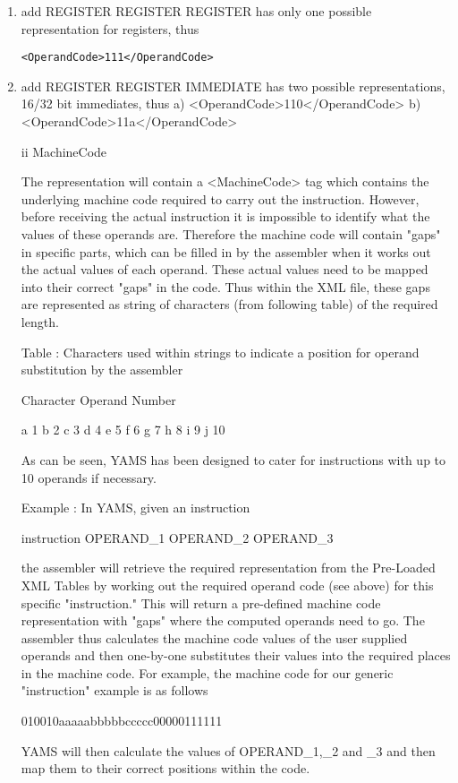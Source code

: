 \documentclass[12pt]{report}
\begin{document}
\begin{enumerate}
\item add REGISTER REGISTER REGISTER has only one possible representation for registers, thus \begin{verbatim}<OperandCode>111</OperandCode>\end{verbatim}
\item add REGISTER REGISTER IMMEDIATE has two possible representations, 16/32 bit immediates, thus
	a)	<OperandCode>110</OperandCode>
	b)	<OperandCode>11a</OperandCode>

ii	MachineCode

The representation will contain a <MachineCode> tag which contains the underlying machine code required to carry out the instruction. However, before receiving the actual instruction it is impossible to identify what the values of these operands are. Therefore the machine code will contain "gaps" in specific parts, which can be filled in by the assembler when it works out the actual values of each operand. These actual values need to be mapped into their correct "gaps" in the code. Thus within the XML file, these gaps are represented as string of characters (from following table) of the required length.

Table : Characters used within strings to indicate a position for operand substitution by the assembler

Character	Operand Number

a		1
b		2
c		3
d		4
e		5
f		6
g		7
h		8
i		9
j		10

As can be seen, YAMS has been designed to cater for instructions with up to 10 operands if necessary.

Example : In YAMS, given an instruction

instruction OPERAND_1 OPERAND_2 OPERAND_3

the assembler will retrieve the required representation from the Pre-Loaded XML Tables by working out the required operand code (see above) for this specific "instruction." This will return a pre-defined machine code representation with "gaps" where the computed operands need to go. The assembler thus calculates the machine code values of the user supplied operands and then one-by-one substitutes their values into the required places in the machine code. For example, the machine code for our generic "instruction" example is as follows

010010aaaaabbbbbccccc00000111111

YAMS will then calculate the values of OPERAND_1,_2 and _3 and then map them to their correct positions within the code.


\end{enumerate}
\end{document}
